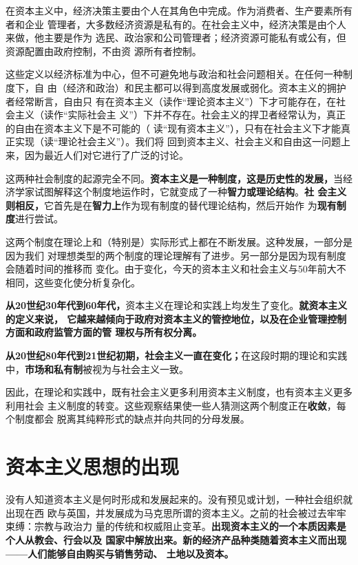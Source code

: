 在资本主义中，经济决策主要由个人在其角色中完成。作为消费者、生产要素所有者和企业
管理者，大多数经济资源是私有的。在社会主义中，经济决策是由个人来做，他主要是作为
选民、政治家和公司管理者；经济资源可能私有或公有，但资源配置由政府控制，不由资
源所有者控制。

这些定义以经济标准为中心，但不可避免地与政治和社会问题相关。在任何一种制度下，自
由（经济和政治）和民主都可以得到高度发展或弱化。资本主义的拥护者经常断言，自由只
有在资本主义（读作“理论资本主义”）下才可能存在，在社会主义（读作“实际社会主
义”）下并不存在。社会主义的捍卫者经常认为，真正的自由在资本主义下是不可能的（
读“现有资本主义”），只有在社会主义下才能真正实现（读“理论社会主义”）。我们将
回到资本主义、社会主义和自由这一问题上来，因为最近人们对它进行了广泛的讨论。

这两种社会制度的起源完全不同。\textbf{资本主义是一种制度，这是历史性的发展，}当经
济学家试图解释这个制度地运作时，它就变成了一种\textbf{智力或理论结构}。\textbf{社
  会主义则相反，}它首先是在\textbf{智力上}作为现有制度的替代理论结构，然后开始作
为\textbf{现有制度}进行尝试。

这两个制度在理论上和（特别是）实际形式上都在不断发展。这种发展，一部分是因为我们
对理想类型的两个制度的理论理解有了进步。另一部分是因为现有制度会随着时间的推移而
变化。由于变化，今天的资本主义和社会主义与50年前大不相同，这些变化使分析复杂化。

\textbf{从20世纪30年代到60年代，}资本主义在理论和实践上均发生了变化。\textbf{就资本主义的定义来说，
它越来越倾向于政府对资本主义的管控地位，以及在企业管理控制方面和政府监管方面的管
理权与所有权分离。}

\textbf{从20世纪80年代到21世纪初期，社会主义一直在变化；}在这段时期的理论和实践
中，\textbf{市场和私有制}被视为与社会主义一致。

因此，在理论和实践中，既有社会主义更多利用资本主义制度，也有资本主义更多利用社会
主义制度的转变。这些观察结果使一些人猜测这两个制度正在\textbf{收敛}，每个制度都会
脱离其纯粹形式的缺点并向共同的分母发展。

\section{资本主义思想的出现}

没有人知道资本主义是何时形成和发展起来的。没有预见或计划，一种社会组织就出现在西
欧与英国，并发展成为马克思所谓的资本主义。之前的社会被过去牢牢束缚：宗教与政治力
量的传统和权威阻止变革。\textbf{出现资本主义的一个本质因素是个人从教会、行会以及
  国家中解放出来。新的经济产品种类随着资本主义而出现——人们能够自由购买与销售劳动、
  土地以及资本。}

